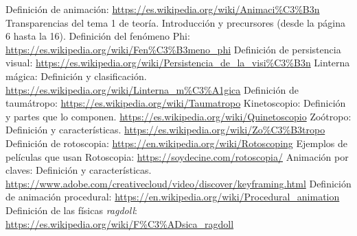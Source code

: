 \documentclass{article}
\begin{document}
\begin{thebibliography}{1}
     Definición de animación: \url{https://es.wikipedia.org/wiki/Animaci%C3%B3n}
     Transparencias del tema 1 de teoría. Introducción y precursores (desde la página 6 hasta la 16).
     Definición del fenómeno Phi: \url{https://es.wikipedia.org/wiki/Fen%C3%B3meno_phi}
     Definición de persistencia visual: \url{https://es.wikipedia.org/wiki/Persistencia_de_la_visi%C3%B3n}
     Linterna mágica: Definición y clasificación. \url{https://es.wikipedia.org/wiki/Linterna_m%C3%A1gica}
     Definición de taumátropo: \url{https://es.wikipedia.org/wiki/Taumatropo}
     Kinetoscopio: Definición y partes que lo componen. \url{https://es.wikipedia.org/wiki/Quinetoscopio}
     Zoótropo: Definición y características. \url{https://es.wikipedia.org/wiki/Zo%C3%B3tropo}
     Definición de rotoscopia: \url{https://en.wikipedia.org/wiki/Rotoscoping}
     Ejemplos de películas que usan Rotoscopia: \url{https://soydecine.com/rotoscopia/}
     Animación por claves: Definición y características. \url{https://www.adobe.com/creativecloud/video/discover/keyframing.html}
     Definición de animación procedural: \url{https://en.wikipedia.org/wiki/Procedural_animation}
     Definición de las físicas \textit{ragdoll}: \url{https://es.wikipedia.org/wiki/F%C3%ADsica_ragdoll}
\end{thebibliography}
\end{document}
